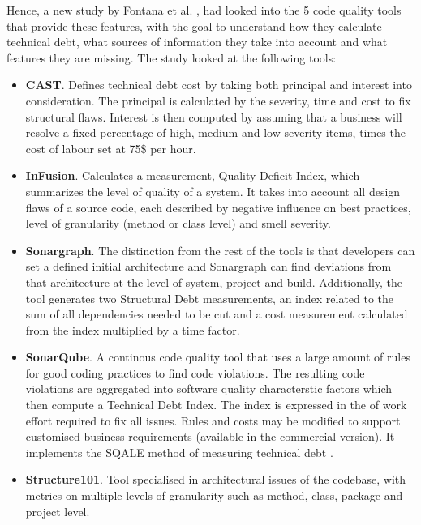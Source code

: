 \documentclass{mprop}
\begin{document}
Hence, a new study by Fontana et al. \cite{Fontana2016}, had looked into the 5
code quality tools that provide these features, with the goal to understand how
they calculate technical debt, what sources of information they take into
account and what features they are missing. The study looked at the following
tools:
\begin{itemize}
	\item \textbf{CAST}. Defines technical debt cost by taking both principal
	      and interest into consideration. The principal is calculated by the
	      severity, time and cost to fix structural flaws. Interest is then computed
	      by assuming that a business will resolve a fixed percentage of high, medium
	      and low severity items, times the cost of labour set at 75\$ per hour.
	\item \textbf{InFusion}. Calculates a measurement, Quality Deficit Index,
	      which summarizes the level of quality of a system. It takes into account all
	      design flaws of a source code, each described by negative influence on best
	      practices, level of granularity (method or class level) and smell severity.
	\item \textbf{Sonargraph}. The distinction from the rest of the tools is
	      that developers can set a defined initial architecture and Sonargraph can
	      find deviations from that architecture at the level of system, project and
	      build. Additionally, the tool generates two Structural Debt measurements, an
	      index related to the sum of all dependencies needed to be cut and a cost
	      measurement calculated from the index multiplied by a time factor.
	\item \textbf{SonarQube}. A continous code quality tool that uses a large
	      amount of rules for good coding practices to find code violations. The
	      resulting code violations are aggregated into software quality characterstic
	      factors which then compute a Technical Debt Index. The index is expressed in
	      the of work effort required to fix all issues. Rules and costs may be
	      modified to support customised business requirements (available in the
	      commercial version). It implements the SQALE method of measuring technical
	      debt \cite{Letouzey2012}.
	\item \textbf{Structure101}. Tool specialised in architectural issues of the
	      codebase, with metrics on multiple levels of granularity such as method,
	      class, package and project level.
\end{itemize}
\end{document}
